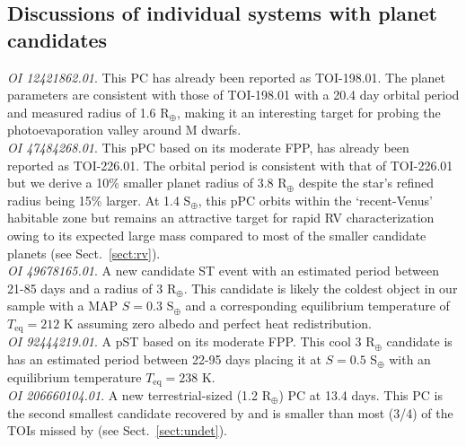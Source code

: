 \subsection{Discussions of individual systems with planet candidates} \label{sect:indiv}
\emph{OI 12421862.01}. This PC has already been reported as TOI-198.01. The \pipeline{} planet parameters
are consistent with those of TOI-198.01 with a 20.4 day orbital period and measured
radius of 1.6 R$_{\oplus}$, making it an interesting target for probing the photoevaporation valley
around M dwarfs. \\

\emph{OI 47484268.01}. This pPC based on its moderate FPP, has already been reported as TOI-226.01.
The \pipeline{} orbital period is consistent with that of TOI-226.01 but we derive a 10\% smaller
planet radius of 3.8 R$_{\oplus}$ despite the star's refined radius being 15\% larger. At 1.4 S$_{\oplus}$,
this pPC orbits within the `recent-Venus' habitable zone but remains an attractive target for rapid RV
characterization owing to its expected large mass compared to most of the smaller candidate planets (see
Sect.~\ref{sect:rv}). \\

\emph{OI 49678165.01}. A new candidate ST event with an estimated period between 21-85 days and a radius of
3 R$_{\oplus}$. This candidate is likely the coldest object in our sample with a MAP $S=0.3$ S$_{\oplus}$
and a corresponding equilibrium temperature of $T_{\text{eq}}= 212$ K assuming zero albedo and perfect heat redistribution. \\

\emph{OI 92444219.01}. A pST based on its moderate FPP. This cool 3 R$_{\oplus}$ candidate is
has an estimated period between 22-95 days placing it at $S=0.5$ S$_{\oplus}$ with
an equilibrium temperature $T_{\text{eq}}= 238$ K. \\


\emph{OI 206660104.01}. A new terrestrial-sized (1.2 R$_{\oplus}$) PC at 13.4 days. This PC is the
second smallest candidate recovered by \pipeline{} and is smaller than most (3/4) of the TOIs missed by
\pipeline{} (see Sect.~\ref{sect:undet}). \\

